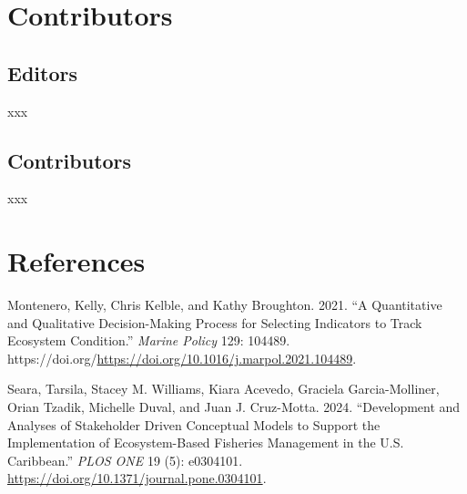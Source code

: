 \documentclass[
  letterpaper,
  oneside,
  open=any]{scrbook}
\newlength{\cslhangindent}
\newenvironment{CSLReferences}[2] %
 {\begin{list}{}{%
  \setlength{\itemindent}{0pt}
  \setlength{\leftmargin}{0pt}
  \setlength{\parsep}{0pt}
  \ifodd #1
   \setlength{\leftmargin}{\cslhangindent}
   \setlength{\itemindent}{-1\cslhangindent}
  \fi
  \setlength{\itemsep}{#2\baselineskip}}}
 {\end{list}}
\begin{document}

\chapter{Contributors}\label{contributors}

\section{\texorpdfstring{\textbf{Editors}}{Editors}}\label{editors}

xxx

\section{\texorpdfstring{\textbf{Contributors}}{Contributors}}\label{contributors-1}

xxx


\chapter*{References}\label{references}


\label{refs}
\begin{CSLReferences}{1}{0}
Montenero, Kelly, Chris Kelble, and Kathy Broughton. 2021. {``A
Quantitative and Qualitative Decision-Making Process for Selecting
Indicators to Track Ecosystem Condition.''} \emph{Marine Policy} 129:
104489.
https://doi.org/\url{https://doi.org/10.1016/j.marpol.2021.104489}.

Seara, Tarsila, Stacey M. Williams, Kiara Acevedo, Graciela
Garcia-Molliner, Orian Tzadik, Michelle Duval, and Juan J. Cruz-Motta.
2024. {``Development and Analyses of Stakeholder Driven Conceptual
Models to Support the Implementation of Ecosystem-Based Fisheries
Management in the U.S. Caribbean.''} \emph{PLOS ONE} 19 (5): e0304101.
\url{https://doi.org/10.1371/journal.pone.0304101}.

\end{CSLReferences}


\backmatter
\end{document}
